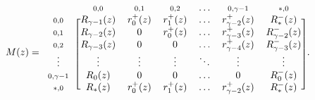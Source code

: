 \documentclass{article}
\begin{document}
\begin{equation*}
M(z) =
\begin{blockarray}{ccccccc}
   & \scriptstyle{0,0} & \scriptstyle{0,1} & \scriptstyle{0,2}
   & \ldots & \scriptstyle{0,\gamma-1} & \scriptstyle{*,0} \\
\begin{block}{c[cccccc]}
\scriptstyle{0,0} & R_{\gamma-1}(z) &
    r_0^+(z) & r_1^+(z) & \ldots & r_{\gamma-2}^+(z) & R_*^-(z) \\
\scriptstyle{0,1} & R_{\gamma-2}(z) & 0 & r_0^+(z) &
    \ldots & r_{\gamma-3}^+(z) & R_{\gamma-2}^-(z) \\
\scriptstyle{0,2} & R_{\gamma-3}(z) & 0 & 0 &
    \ldots & r_{\gamma-4}^+(z) & R_{\gamma-3}^-(z)  \\
\vdots & \vdots & \vdots & \vdots & \ddots & \vdots & \vdots \\
\scriptstyle{0,\gamma-1} & R_0(z) & 0 & 0 & \ldots & 0 & R_0^-(z) \\
\scriptstyle{*,0} & R_*(z) &
    r_0^+(z) & r_1^+(z) & \ldots & r_{\gamma-2}^+(z) & R_*^-(z) \\
\end{block}
\end{blockarray}.
\end{equation*}


\end{document}
